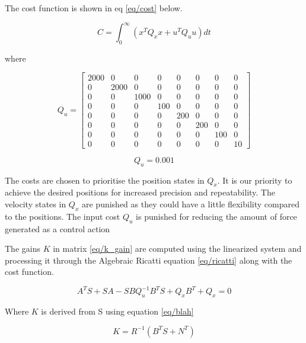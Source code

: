 \documentclass{UoNMCHA}
\numberwithin{equation}{section}
\begin{document}
	The cost function is shown in eq \eqref{eq/cost} below.
	
	\begin{equation} \label{eq/cost}
	C=\int_{0}^{\infty}\left(x^{T} Q_{x} x+u^{T} Q_{u} u\right) d t
	\end{equation}
		
	where
	
	\begin{equation}
	Q_u = 
	\begin{bmatrix}2000 & 0 & 0 & 0 & 0 & 0 & 0 & 0 \\ 0 & 2000 & 0 & 0 & 0 & 0 & 0 & 0 \\ 0 & 0 & 1000 & 0 & 0 & 0 & 0 & 0 \\ 0 & 0 & 0 & 100 & 0 & 0 & 0 & 0 \\ 0 & 0 & 0 & 0 & 200 & 0 & 0 & 0 \\ 0 & 0 & 0 & 0 & 0 & 200 & 0 & 0 \\ 0 & 0 & 0 & 0 & 0 & 0 & 100 & 0 \\ 0 & 0 & 0 & 0 & 0 & 0 & 0 & 10\end{bmatrix}
	\end{equation}
	
	\begin{equation}
	Q_{u}=0.001
	\end{equation}
	
	The costs are chosen to prioritise the position states in $Q_{x}$. It is our priority to achieve the desired
	positions for increased precision and repeatability. The velocity states in $Q_{x}$ are punished as they could
	have a little flexibility compared to the positions. The input cost $Q_{u}$ is punished for reducing the amount
	of force generated as a control action
	
	\newpage
	
	The gains $K$ in matrix \eqref{eq/k_gain} are computed using the linearized system and processing it through the
	Algebraic Ricatti equation \eqref{eq/ricatti} along with the cost function.
	
	\begin{equation}\label{eq/ricatti}
	A^{T} S+S A-S B Q_{u}^{-1} B^{T} S+Q_{x} B^{T}+Q_{x}=0
	\end{equation}

	Where ${K}$ is derived from S using equation \eqref{eq/blah}
	
	\begin{equation}\label{eq/blah}
	K=R^{-1}\left(B^{T} S+N^{T}\right)
	\end{equation}
\end{document}
